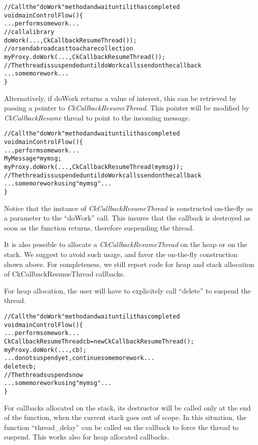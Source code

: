 \begin{alltt}
// Call the "doWork" method and wait until it has completed
void mainControlFlow() \{
  ...perform some work...
  // call a library
  doWork(...,CkCallbackResumeThread());
  // or send a broadcast to a chare collection
  myProxy.doWork(...,CkCallbackResumeThread());
  // The thread is suspended until doWork calls send on the callback
  ...some more work...
\}
\end{alltt}

Alternatively, if doWork returns a value of interest, this can be retrieved by
passing a pointer to {\em CkCallbackResumeThread}. This pointer will be modified
by {\em CkCallbackResume} thread to point to the incoming message.

\begin{alltt}
// Call the "doWork" method and wait until it has completed
void mainControlFlow() \{
  ...perform some work...
  MyMessage *mymsg;
  myProxy.doWork(...,CkCallbackResumeThread(mymsg));
  // The thread is suspended until doWork calls send on the callback
  ...some more work using "mymsg"...
\}
\end{alltt}

Notice that the instance of {\em CkCallbackResumeThread} is constructed
on-the-fly as a parameter to the ``doWork'' call. This insures that the callback
is destroyed as soon as the function returns, therefore suspending the thread.

It is also possible to allocate a {\em CkCallbackResumeThread} on the heap or on
the stack. We suggest to avoid such usage, and favor the on-the-fly construction
shown above. For completeness, we still report code for heap and stack
allocation of CkCallbackResumeThread callbacks.

For heap allocation, the user will have to explicitely call ``delete'' to
suspend the thread.

\begin{alltt}
// Call the "doWork" method and wait until it has completed
void mainControlFlow() \{
  ...perform some work...
  CkCallbackResumeThread cb = new CkCallbackResumeThread();
  myProxy.doWork(...,cb);
  ...do not suspend yet, continue some more work...
  delete cb;
  // The thread suspends now
  ...some more work using "mymsg"...
\}
\end{alltt}

For callbacks allocated on the stack, its destructor will be called only at the
end of the function, when the current stack goes out of scope. In this
situation, the function ``thread\_delay'' can be called on the callback to
force the thread to suspend. This works also for heap allocated callbacks.

